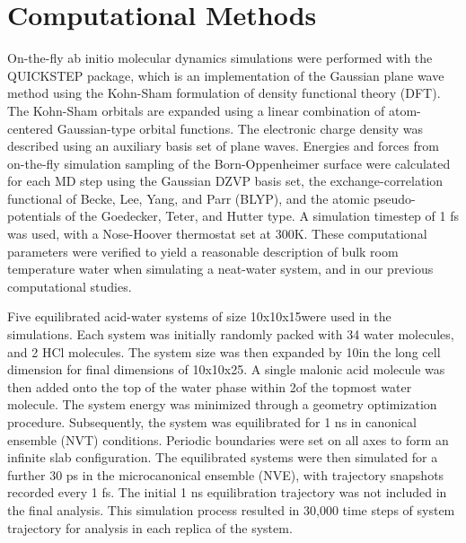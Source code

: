 \section {Computational Methods}

On-the-fly ab initio molecular dynamics simulations were performed with the QUICKSTEP package, which is an implementation of the Gaussian plane wave method using the Kohn-Sham formulation of density functional theory (DFT).\cite{VandeVondele2005} The Kohn-Sham orbitals are expanded using a linear combination of atom-centered Gaussian-type orbital functions. The electronic charge density was described using an auxiliary basis set of plane waves. Energies and forces from on-the-fly simulation sampling of the Born-Oppenheimer surface were calculated for each MD step using the Gaussian DZVP basis set, the exchange-correlation functional of Becke, Lee, Yang, and Parr (BLYP),\cite{LEE1988} and the atomic pseudo-potentials of the Goedecker, Teter, and Hutter type.\cite{Goedecker1996} A simulation timestep of 1 fs was used, with a Nose-Hoover thermostat set at 300K. These computational parameters were verified to yield a reasonable description of bulk room temperature water when simulating a neat-water system, and in our previous computational studies.\cite{Shamay2007}

Five equilibrated acid-water systems of size 10x10x15\angs were used in the simulations. Each system was initially randomly packed with 34 water molecules, and 2 HCl molecules. The system size was then expanded by 10\angs in the long cell dimension for final dimensions of 10x10x25\angs. A single malonic acid molecule was then added onto the top of the water phase within 2\angs of the topmost water molecule. The system energy was minimized through a geometry optimization procedure. Subsequently, the system was equilibrated for 1 ns in canonical ensemble (NVT) conditions. Periodic boundaries were set on all axes to form an infinite slab configuration. The equilibrated systems were then simulated for a further 30 ps in the microcanonical ensemble (NVE), with trajectory snapshots recorded every 1 fs. The initial 1 ns equilibration trajectory was not included in the final analysis. This simulation process resulted in 30,000 time steps of system trajectory for analysis in each replica of the system.
 
